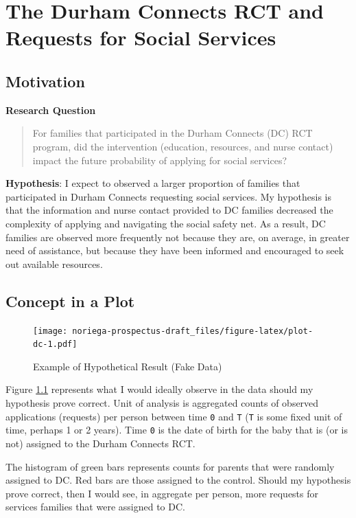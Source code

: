\documentclass[12pt,letterpaperpaper,]{book}
\begin{document}
\chapter{The Durham Connects RCT and Requests for Social
Services}\label{chapter-2}

\section*{Motivation}\label{motivation-1}

\textbf{Research Question}

\begin{quote}
For families that participated in the Durham Connects (DC) RCT program,
did the intervention (education, resources, and nurse contact) impact
the future probability of applying for social services?
\end{quote}

\textbf{Hypothesis}: I expect to observed a larger proportion of
families that participated in Durham Connects requesting social
services. My hypothesis is that the information and nurse contact
provided to DC families decreased the complexity of applying and
navigating the social safety net. As a result, DC families are observed
more frequently not because they are, on average, in greater need of
assistance, but because they have been informed and encouraged to seek
out available resources.

\section*{Concept in a Plot}\label{concept-in-a-plot-1}

\begin{figure}
\centering
\texttt{[image: noriega-prospectus-draft\_files/figure-latex/plot-dc-1.pdf]}
\caption{\label{fig:plot-dc}Example of Hypothetical Result (Fake Data)}
\end{figure}

Figure \ref{fig:plot-dc} represents what I would ideally observe in the
data should my hypothesis prove correct. Unit of analysis is aggregated
counts of observed applications (requests) per person between time
\texttt{0} and \texttt{T} (\texttt{T} is some fixed unit of time,
perhaps 1 or 2 years). Time \texttt{0} is the date of birth for the baby
that is (or is not) assigned to the Durham Connects RCT.

The histogram of green bars represents counts for parents that were
randomly assigned to DC. Red bars are those assigned to the control.
Should my hypothesis prove correct, then I would see, in aggregate per
person, more requests for services families that were assigned to DC.
\end{document}
